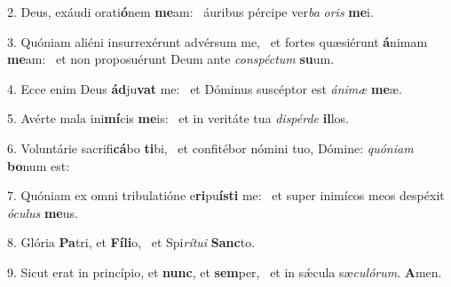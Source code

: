 2. Deus, exáudi orati\textbf{ó}nem \textbf{me}am: \ast\  áuribus pércipe ver\textit{ba} \textit{o}\textit{ris} \textbf{me}i.\

3. Quóniam aliéni insurrexérunt advérsum me, \dag\  et fortes quæsiérunt \textbf{á}nimam \textbf{me}am: \ast\  et non proposuérunt Deum ante \textit{con}\textit{spéc}\textit{tum} \textbf{su}um.\

4. Ecce enim Deus \textbf{ád}ju\textbf{vat} me: \ast\  et Dóminus suscéptor est \textit{á}\textit{ni}\textit{mæ} \textbf{me}æ.\

5. Avérte mala ini\textbf{mí}cis \textbf{me}is: \ast\  et in veritáte tua \textit{dis}\textit{pér}\textit{de} \textbf{il}los.\

6. Voluntárie sacrifi\textbf{cá}bo \textbf{ti}bi, \ast\  et confitébor nómini tuo, Dómine: \textit{quón}\textit{i}\textit{am} \textbf{bo}num est:\

7. Quóniam ex omni tribulatióne e\textbf{ri}pu\textbf{ís}\textbf{ti} me: \ast\  et super inimícos meos despéxit \textit{ó}\textit{cu}\textit{lus} \textbf{me}us.\

8. Glória \textbf{Pa}tri, et \textbf{Fí}\textbf{li}o, \ast\  et Spi\textit{rí}\textit{tu}\textit{i} \textbf{Sanc}to.\

9. Sicut erat in princípio, et \textbf{nunc}, et \textbf{sem}per, \ast\  et in sǽcula sæ\textit{cu}\textit{ló}\textit{rum}. \textbf{A}men.\

